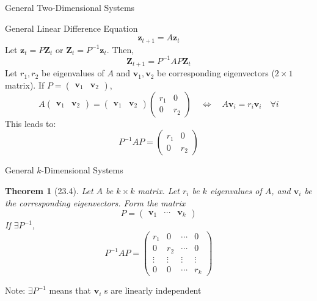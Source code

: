 \documentclass[final]{beamer}
\newtheorem{thm}{Theorem}
\newcommand{\bd}{\mathbf}
\begin{document}
\begin{frame}[t]{General Two-Dimensional Systems}
	\begin{block}
		{General Linear Difference Equation}
		\[
			\bd{z}_{t+1}=A\bd{z}_t
		\]
		Let $\bd{z}_t=P\bd{Z}_t$ or $\bd{Z}_t=P^{-1}\bd{z}_t$. Then,
		\[
			\bd{Z}_{t+1} = P^{-1}AP\bd{Z}_t
		\]
		Let $r_1,r_2$ be eigenvalues of $A$ and $\bd{v}_1, \bd{v}_2$ be corresponding eigenvectors ($2\times 1$ matrix). If $P=\begin{pmatrix}
			\bd{v}_1 & \bd{v}_2
		\end{pmatrix}$, \[
			A\begin{pmatrix}
			\bd{v}_1 & \bd{v}_2
		\end{pmatrix} = \begin{pmatrix}
			\bd{v}_1 & \bd{v}_2
		\end{pmatrix} \begin{pmatrix}
			r_1 & 0\\
			0 & r_2
		\end{pmatrix} \quad\iff\quad A\bd{v}_i = r_i\bd{v}_i\quad\forall i \tag{Th23.3}
		\]
		This leads to: \[
			P^{-1}AP = \begin{pmatrix}
			r_1 & 0\\
			0 & r_2
		\end{pmatrix}
		\]
	\end{block}
\end{frame}

\begin{frame}[t]{General $k$-Dimensional Systems}
	\begin{thm}
		[23.4] Let $A$ be $k\times k$ matrix. Let $r_i$ be $k$ eigenvalues of $A$, and $\bd{v}_i$ be the corresponding eigenvectors. Form the matrix\[
			P = \begin{pmatrix}
				\bd{v}_1 & \cdots & \bd{v}_k
			\end{pmatrix}
		\]If $\exists P^{-1}$, \[
			P^{-1}AP = \begin{pmatrix}
				r_1 & 0 & \cdots & 0\\
				0 & r_2 & \cdots & 0\\
				\vdots & \vdots & \vdots & \vdots\\
				0 & 0 & \cdots & r_k
			\end{pmatrix}
		\]
	\end{thm}
	Note: $\exists P^{-1}$ means that $\bd{v}_i$ s are linearly independent
\end{frame}
\end{document}
